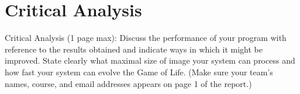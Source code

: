 \documentclass{article}
\begin{document}
    \section{Critical Analysis}
    Critical Analysis (1 page max): Discuss the performance of your program with reference to the results obtained and indicate ways in which it might be improved. State clearly what maximal size of image your system can process and how fast your system can evolve the Game of Life. (Make sure your team’s names, course, and email addresses appears on page 1 of the report.) 
\end{document}
